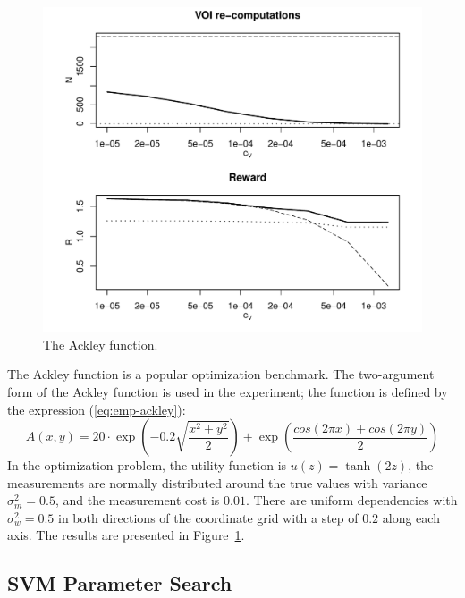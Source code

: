 \begin{figure}[t]
\centering
\includegraphics[scale=0.63]{raticomp-ackley.pdf}
\caption{The Ackley function.}
\label{fig:ackley}
\end{figure}
The Ackley function \cite{Ackley.function} is a popular optimization
benchmark. The two-argument form of the Ackley function is used in the
experiment; the function is defined by the expression (\ref{eq:emp-ackley}):
\begin{equation}
\label{eq:emp-ackley}
A(x,y)=20\cdot \exp\left(-0.2\sqrt { \frac {x^2+y^2} 2}\right)+\exp\left(\frac{cos(2\pi x)+cos(2\pi y)} 2\right)
\end{equation}
In the optimization problem, the utility function is
$u(z)=\tanh(2z)$, the measurements are normally distributed around the
true values with variance $\sigma_m^2=0.5$, and the measurement cost is
$0.01$. There are uniform dependencies with $\sigma_w^2=0.5$ in both
directions of the coordinate grid with a step of $0.2$ along each axis.
The results are presented in Figure~\ref{fig:ackley}.

\subsection{SVM Parameter Search}
\label{sec:raticomp-svm}


